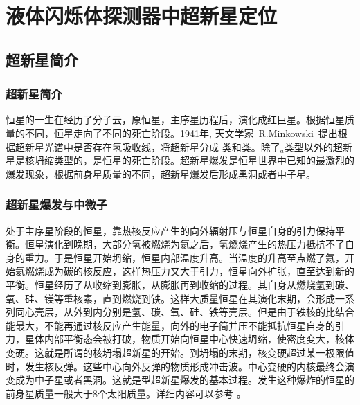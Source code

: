 
\chapter{液体闪烁体探测器中超新星定位}
\label{chap:chap6}
\section{超新星简介}
\subsection{超新星简介}
恒星的一生在经历了分子云，原恒星，主序星历程后，演化成红巨星。根据恒星质量的不同，恒星走向了不同的死亡阶段。1941年, 天文学家~R.Minkowski~提出根据超新星光谱中是否存在氢吸收线，将超新星分成
\uppercase\expandafter{}类和\uppercase\expandafter{}类\citep{minkowski1941spectra}。除了\uppercase\expandafter{}$_a$类型以外的超新星是核坍缩类型的，是恒星的死亡阶段。超新星爆发是恒星世界中已知的最激烈的爆发现象，根据前身星质量的不同，超新星爆发后形成黑洞或者中子星。

\subsection{超新星爆发与中微子}
处于主序星阶段的恒星，靠热核反应产生的向外辐射压与恒星自身的引力保持平衡。恒星演化到晚期，大部分氢被燃烧为氦之后，氢燃烧产生的热压力抵抗不了自身的重力。于是恒星开始坍缩，恒星内部温度升高。当温度的升高至点燃了氦，开始氦燃烧成为碳的核反应，这样热压力又大于引力，恒星向外扩张，直至达到新的平衡。恒星经历了从收缩到膨胀，从膨胀再到收缩的过程。其自身从燃烧氢到碳、氧、硅、镁等重核素，直到燃烧到铁。这样大质量恒星在其演化末期，会形成一系列同心壳层，从外到内分别是氢、碳、氧、硅、铁等壳层。但是由于铁核的比结合能最大，不能再通过核反应产生能量，向外的电子简并压不能抵抗恒星自身的引力，星体内部平衡态会被打破，物质开始向恒星中心快速坍缩，使密度变大，核体变硬。这就是所谓的核坍塌超新星的开始。到坍塌的末期，核变硬超过某一极限值时，发生核反弹。这些中心向外反弹的物质形成冲击波。中心变硬的内核最终会演变成为中子星或者黑洞。这就是\uppercase\expandafter{}型超新星爆发的基本过程。发生这种爆炸的恒星的前身星质量一般大于8个太阳质量。详细内容可以参考
\citep{bethe1990supernova}。

